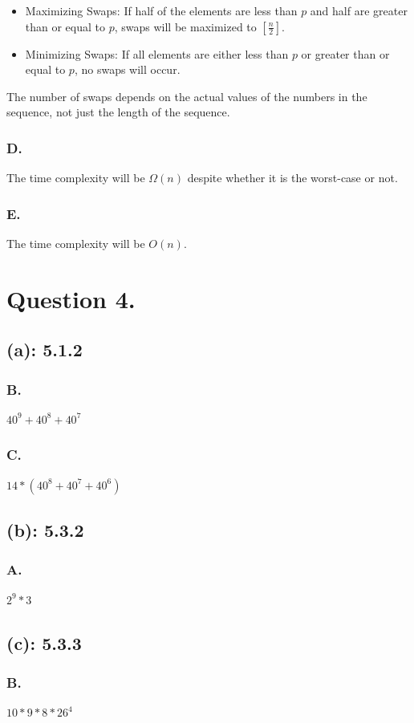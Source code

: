 \documentclass[titlepage]{article}\pagestyle{empty}
\begin{document}
\begin{itemize}
\item Maximizing Swaps: If half of the elements are less than $p$ and half are greater than or equal to $p$, swaps will be maximized to $[\frac{n}{2}]$.
\item Minimizing Swaps: If all elements are either less than $p$ or greater than or equal to $p$, no swaps will occur.
\end{itemize}

The number of swaps depends on the actual values of the numbers in the sequence, not just the length of the sequence.
\subsubsection*{D.} The time complexity will be $\Omega(n)$ despite whether it is the worst-case or not.
\subsubsection*{E.} The time complexity will be $O(n)$.

\pagebreak
\section*{Question 4.}
\subsection*{(a): 5.1.2}
\subsubsection*{B.} $40^9 + 40^8 + 40^7$
\subsubsection*{C.} $14 * (40^8 + 40^7 + 40^6)$
\subsection*{(b): 5.3.2}
\subsubsection*{A.} $2^9 * 3$
\subsection*{(c): 5.3.3}
\subsubsection*{B.} $10 * 9 * 8 * 26^4$
\end{document}
